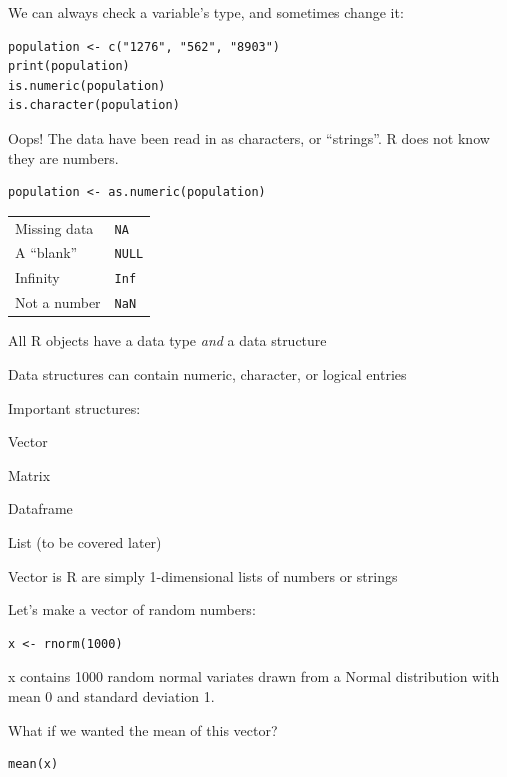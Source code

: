 \documentclass[pdflatex,landscape,titlepage]{foils}
\begin{document}
We can always check a variable's type, and sometimes change it:

\begin{verbatim}
population <- c("1276", "562", "8903")
print(population)
is.numeric(population)
is.character(population)
\end{verbatim}

Oops!  The data have been read in as characters, or ``strings''.  R does not know they are numbers.

\begin{verbatim}
population <- as.numeric(population)
\end{verbatim}


\begin{tabular}{ll}
Missing data &   \texttt{NA} \\
A ``blank''  &   \texttt{NULL} \\
Infinity     &   \texttt{Inf} \\
Not a number &   \texttt{NaN} \\
\end{tabular}


All R objects have a data type \emph{and} a data structure

Data structures can contain numeric, character, or logical entries

Important structures:

\begin{center}
Vector 

Matrix 

Dataframe 

List (to be covered later)
\end{center}


Vector is R are simply 1-dimensional lists of numbers or strings

Let's make a vector of random numbers:

\begin{verbatim}
x <- rnorm(1000)
\end{verbatim}

x contains 1000 random normal variates drawn from a Normal
distribution with mean 0 and standard deviation 1.

What if we wanted the mean of this vector?

\begin{verbatim}
mean(x)
\end{verbatim}
\end{document}
